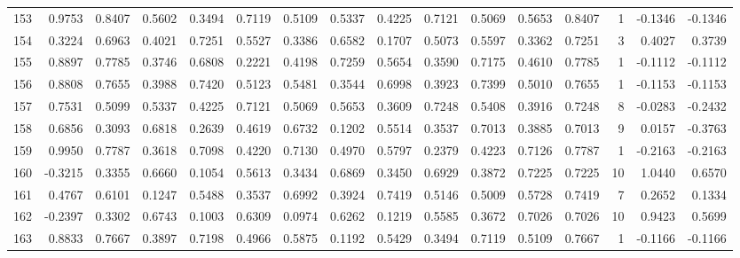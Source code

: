 \begin{tabular}{lrrrrrrrrrrrrrrr}
153 &      0.9753 &  0.8407 &  0.5602 &  0.3494 &  0.7119 &  0.5109 &  0.5337 &  0.4225 &  0.7121 &  0.5069 &   0.5653 &     0.8407 &      1 &                   -0.1346 &                    -0.1346 \\
154 &      0.3224 &  0.6963 &  0.4021 &  0.7251 &  0.5527 &  0.3386 &  0.6582 &  0.1707 &  0.5073 &  0.5597 &   0.3362 &     0.7251 &      3 &                    0.4027 &                     0.3739 \\
155 &      0.8897 &  0.7785 &  0.3746 &  0.6808 &  0.2221 &  0.4198 &  0.7259 &  0.5654 &  0.3590 &  0.7175 &   0.4610 &     0.7785 &      1 &                   -0.1112 &                    -0.1112 \\
156 &      0.8808 &  0.7655 &  0.3988 &  0.7420 &  0.5123 &  0.5481 &  0.3544 &  0.6998 &  0.3923 &  0.7399 &   0.5010 &     0.7655 &      1 &                   -0.1153 &                    -0.1153 \\
157 &      0.7531 &  0.5099 &  0.5337 &  0.4225 &  0.7121 &  0.5069 &  0.5653 &  0.3609 &  0.7248 &  0.5408 &   0.3916 &     0.7248 &      8 &                   -0.0283 &                    -0.2432 \\
158 &      0.6856 &  0.3093 &  0.6818 &  0.2639 &  0.4619 &  0.6732 &  0.1202 &  0.5514 &  0.3537 &  0.7013 &   0.3885 &     0.7013 &      9 &                    0.0157 &                    -0.3763 \\
159 &      0.9950 &  0.7787 &  0.3618 &  0.7098 &  0.4220 &  0.7130 &  0.4970 &  0.5797 &  0.2379 &  0.4223 &   0.7126 &     0.7787 &      1 &                   -0.2163 &                    -0.2163 \\
160 &     -0.3215 &  0.3355 &  0.6660 &  0.1054 &  0.5613 &  0.3434 &  0.6869 &  0.3450 &  0.6929 &  0.3872 &   0.7225 &     0.7225 &     10 &                    1.0440 &                     0.6570 \\
161 &      0.4767 &  0.6101 &  0.1247 &  0.5488 &  0.3537 &  0.6992 &  0.3924 &  0.7419 &  0.5146 &  0.5009 &   0.5728 &     0.7419 &      7 &                    0.2652 &                     0.1334 \\
162 &     -0.2397 &  0.3302 &  0.6743 &  0.1003 &  0.6309 &  0.0974 &  0.6262 &  0.1219 &  0.5585 &  0.3672 &   0.7026 &     0.7026 &     10 &                    0.9423 &                     0.5699 \\
163 &      0.8833 &  0.7667 &  0.3897 &  0.7198 &  0.4966 &  0.5875 &  0.1192 &  0.5429 &  0.3494 &  0.7119 &   0.5109 &     0.7667 &      1 &                   -0.1166 &                    -0.1166 \\

\end{tabular}
